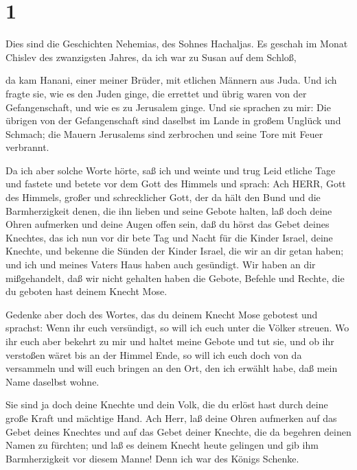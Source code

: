 \hypertarget{section}{%
\section{1}\label{section}}

 Dies sind die Geschichten Nehemias, des Sohnes Hachaljas.
Es geschah im Monat Chislev des zwanzigsten Jahres, da ich war zu Susan
auf dem Schloß,

 da kam Hanani, einer meiner Brüder, mit etlichen Männern
aus Juda. Und ich fragte sie, wie es den Juden ginge, die errettet und
übrig waren von der Gefangenschaft, und wie es zu Jerusalem ginge.
 Und sie sprachen zu mir: Die übrigen von der Gefangenschaft
sind daselbst im Lande in großem Unglück und Schmach; die Mauern
Jerusalems sind zerbrochen und seine Tore mit Feuer verbrannt.

 Da ich aber solche Worte hörte, saß ich und weinte und trug
Leid etliche Tage und fastete und betete vor dem Gott des Himmels
 und sprach: Ach HERR, Gott des Himmels, großer und
schrecklicher Gott, der da hält den Bund und die Barmherzigkeit denen,
die ihn lieben und seine Gebote halten,  laß doch deine
Ohren aufmerken und deine Augen offen sein, daß du hörst das Gebet
deines Knechtes, das ich nun vor dir bete Tag und Nacht für die Kinder
Israel, deine Knechte, und bekenne die Sünden der Kinder Israel, die wir
an dir getan haben; und ich und meines Vaters Haus haben auch gesündigt.
 Wir haben an dir mißgehandelt, daß wir nicht gehalten haben
die Gebote, Befehle und Rechte, die du geboten hast deinem Knecht Mose.

 Gedenke aber doch des Wortes, das du deinem Knecht Mose
gebotest und sprachst: Wenn ihr euch versündigt, so will ich euch unter
die Völker streuen.  Wo ihr euch aber bekehrt zu mir und
haltet meine Gebote und tut sie, und ob ihr verstoßen wäret bis an der
Himmel Ende, so will ich euch doch von da versammeln und will euch
bringen an den Ort, den ich erwählt habe, daß mein Name daselbst wohne.

 Sie sind ja doch deine Knechte und dein Volk, die du
erlöst hast durch deine große Kraft und mächtige Hand.  Ach
Herr, laß deine Ohren aufmerken auf das Gebet deines Knechtes und auf
das Gebet deiner Knechte, die da begehren deinen Namen zu fürchten; und
laß es deinem Knecht heute gelingen und gib ihm Barmherzigkeit vor
diesem Manne! Denn ich war des Königs Schenke.

